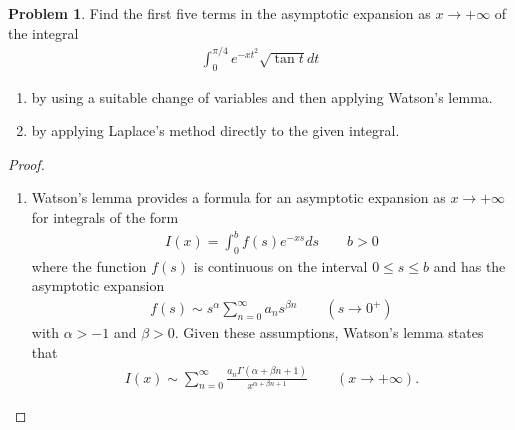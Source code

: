 \documentclass[12pt]{article}
\theoremstyle{definition}
\newtheorem{problem}{Problem}
\begin{document}
\begin{problem}
  Find the first five terms in the asymptotic expansion as $x \to +\infty$ of the integral
  \begin{align*}
    \int_0^{\pi/4} e^{-xt^2}\sqrt{\tan t}   dt
  \end{align*}
  \begin{enumerate}
    \item by using a suitable change of variables and then applying Watson's lemma.
    \item by applying Laplace's method directly to the given integral.
  \end{enumerate}
\end{problem}

\begin{proof}
  \begin{enumerate}
    \item Watson's lemma provides a formula for an asymptotic expansion as $x\to +\infty$ for integrals of the form
      \begin{align}\label{watson_form}
        I(x) = \int_0^b f(s) e^{-xs} ds \qquad b > 0
      \end{align}
      where the function $f(s)$ is continuous on the interval $0\leq s \leq b$ and has the asymptotic expansion
      \begin{align*}
        f(s) \sim s^{\alpha} \sum_{n=0}^\infty a_ns^{\beta n}\qquad (s \to 0^+)
      \end{align*}
      with $\alpha > -1$ and $\beta > 0$. Given these assumptions, Watson's lemma states that
      \begin{align}\label{watsons}
        I(x) \sim \sum_{n=0}^\infty \frac{a_n \Gamma(\alpha + \beta n +1)}{x^{\alpha + \beta n + 1}} \qquad (x \to + \infty).
      \end{align}


\end{enumerate}
\end{proof}
\end{document}
